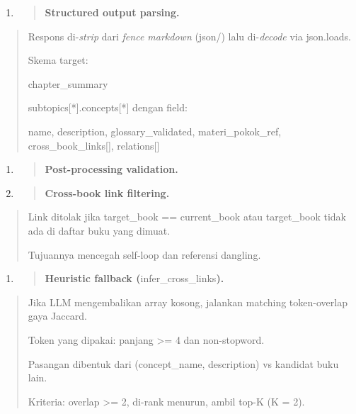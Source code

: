 \documentclass[
]{article}
\begin{document}
\begin{enumerate}
\def\labelenumi{\arabic{enumi}.}
\setcounter{enumi}{5}
\item
  \begin{quote}
  \textbf{Structured output parsing.}
  \end{quote}
\end{enumerate}

\begin{quote}
Respons di-\emph{strip} dari \emph{fence markdown} (json/) lalu
di-\emph{decode} via json.loads.

Skema target:

chapter\_summary

subtopics{[}*{]}.concepts{[}*{]} dengan field:

name, description, glossary\_validated, materi\_pokok\_ref,
cross\_book\_links{[}{]}, relations{[}{]}
\end{quote}

\begin{enumerate}
\def\labelenumi{\arabic{enumi}.}
\setcounter{enumi}{6}
\item
  \begin{quote}
  \textbf{Post-processing validation.}
  \end{quote}
\item
  \begin{quote}
  \textbf{\hspace{0pt}\hspace{0pt}Cross-book link filtering.}
  \end{quote}
\end{enumerate}

\begin{quote}
Link ditolak jika target\_book == current\_book atau target\_book tidak
ada di daftar buku yang dimuat.

Tujuannya mencegah self-loop dan referensi dangling.
\end{quote}

\begin{enumerate}
\def\labelenumi{\arabic{enumi}.}
\setcounter{enumi}{8}
\item
  \begin{quote}
  \textbf{Heuristic fallback (}infer\_cross\_links\textbf{).}
  \end{quote}
\end{enumerate}

\begin{quote}
Jika LLM mengembalikan array kosong, jalankan matching token-overlap
gaya Jaccard.

Token yang dipakai: panjang \textgreater= 4 dan non-stopword.

Pasangan dibentuk dari (concept\_name, description) vs kandidat buku
lain.

Kriteria: \textbar overlap\textbar{} \textgreater= 2, di-rank menurun,
ambil top-K (K = 2).
\end{quote}
\end{document}
